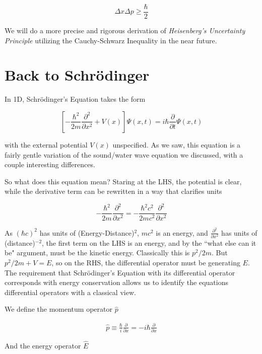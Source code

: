 \[
\Delta x \Delta p \geq \frac{\hbar}{2}
\] \vspace{3px}

We will do a more precise and rigorous derivation of \textit{Heisenberg's Uncertainty
Principle} utilizing the Cauchy-Schwarz Inequality in the near future. 

\section{Back to Schr\"odinger} 

In 1D, Schr\"odinger's Equation takes the form 

\[
  \left[ -\frac{\hbar^2}{2m} \frac{\partial^2 }{\partial x^2} + V(x)\right]
  \Psi(x, t) = i\hbar \frac{\partial }{\partial t} \Psi(x, t)
\] \vspace{3px}

with the external potential $V(x)$ unspecified. As we saw, this equation is
a fairly gentle variation of the sound/water wave equation we discussed, with
a couple interesting differences. 

So what does this equation mean? Staring at the LHS, the potential is clear,
while the derivative term can be rewritten in a way that clarifies units

\[
-\frac{\hbar^2}{2m} \frac{\partial^2 }{\partial x^2}
= -\frac{\hbar^2c^2}{2mc^2} \frac{\partial^2 }{\partial x^2} 
\] \vspace{3px}

As  $(\hbar c)^2$ has units of (Energy-Distance)$^2$,  $mc^2$ is an energy, and
$ \frac{\partial^2 }{\partial x^2} $ has units of (distance)$^{-2}$, the first
term on the LHS is an energy, and by the ``what else can it be" argument, must
be the kinetic energy. Classically this is $p^2 / 2m$. But $p^2/2m + V = E$, so
on the RHS, the differential operator must be generating $E$. The requirement
that Schr\"odinger's Equation with its differential operator corresponds with
energy conservation allows us to identify the equations differential operators
with a classical view. 

We define the momentum operator $\hat{p}$ 

\begin{align}\label{eq:momentum}
  \hat{p} \equiv \frac{\hbar}{i} \frac{\partial }{\partial x} = -i\hbar
  \frac{\partial }{\partial x} 
\end{align}\vspace{3px}

And the energy operator $\hat{E}$

